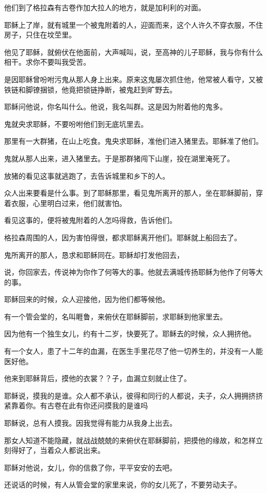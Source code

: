 \documentclass[12pt,oneside]{book}
\begin{document}
他们到了格拉森有古卷作加大拉人的地方，就是加利利的对面。

耶稣上了岸，就有城里一个被鬼附着的人，迎面而来，这个人许久不穿衣服，不住房子，只住在坟茔里。

他见了耶稣，就俯伏在他面前，大声喊叫，说，至高神的儿子耶稣，我与你有什么相干。求你不要叫我受苦。

是因耶稣曾吩咐污鬼从那人身上出来。原来这鬼屡次抓住他，他常被人看守，又被铁链和脚镣捆锁，他竟把锁链挣断，被鬼赶到旷野去。

耶稣问他说，你名叫什么。他说，我名叫群。这是因为附着他的鬼多。

鬼就央求耶稣，不要吩咐他们到无底坑里去。

那里有一大群猪，在山上吃食。鬼央求耶稣，准他们进入猪里去。耶稣准了他们。

鬼就从那人出来，进入猪里去。于是那群猪闯下山崖，投在湖里淹死了。

放猪的看见这事就逃跑了，去告诉城里和乡下的人。

众人出来要看是什么事。到了耶稣那里，看见鬼所离开的那人，坐在耶稣脚前，穿着衣服，心里明白过来，他们就害怕。

看见这事的，便将被鬼附着的人怎吗得救，告诉他们。

格拉森周围的人，因为害怕得很，都求耶稣离开他们。耶稣就上船回去了。

鬼所离开的那人，恳求和耶稣同在。耶稣却打发他回去，

说，你回家去，传说神为你作了何等大的事。他就去满城传扬耶稣为他作了何等大的事。

耶稣回来的时候，众人迎接他，因为他们都等候他。

有一个管会堂的，名叫睚鲁，来俯伏在耶稣脚前，求耶稣到他家里去。

因为他有一个独生女儿，约有十二岁，快要死了。耶稣去的时候，众人拥挤他。

有一个女人，患了十二年的血漏，在医生手里花尽了他一切养生的，并没有一人能医好他。

他来到耶稣背后，摸他的衣裳？？子，血漏立刻就止住了。

耶稣说，摸我的是谁。众人都不承认，彼得和同行的人都说，夫子，众人拥拥挤挤紧靠着你。有古卷在此有你还问摸我的是谁吗

耶稣说，总有人摸我。因我觉得有能力从我身上出去。

那女人知道不能隐藏，就战战兢兢的来俯伏在耶稣脚前，把摸他的缘故，和怎样立刻得好了，当着众人都说出来。

耶稣对他说，女儿，你的信救了你，平平安安的去吧。

还说话的时候，有人从管会堂的家里来说，你的女儿死了，不要劳动夫子。
\end{document}
